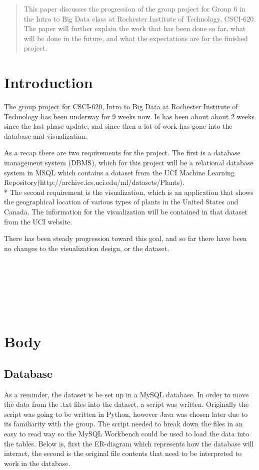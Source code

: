 \documentclass{Group6_Phase2}
\begin{document}
\maketitle
\begin{abstract}
This paper discusses the progression of the group project for Group 6 in the Intro to Big Data class at Rochester Institute of Technology, CSCI-620. The paper will further explain the work that has been done so far, what will be done in the future, and what the expectations are for the finished project. 
\end{abstract}


\section{Introduction}
The group project for CSCI-620, Intro to Big Data at Rochester Institute of Technology has been underway for 9 weeks now. Is has been about about 2 weeks since the last phase update, and since then a lot of work has gone into the database and visualization. 

As a recap there are two requirements for the project. The first is a database management system (DBMS), which for this project will be a relational database system in MSQL which contains a dataset from the UCI Machine Learning Repository(http://archive.ics.uci.edu/ml/datasets/Plants).\\* The second requirement is the visualization, which is an application that shows the geographical location of various types of plants in the United States and Canada. The information for the visualization will be contained in that dataset from the UCI website. 

There has been steady progression toward this goal, and so far there have been no changes to the visualization design, or the dataset. 
\\\\\\\\\\\\\\

\section{Body}

\subsection{Database}
As a reminder, the dataset is be set up in a MySQL database. In order to move the data from the .txt files into the dataset, a script was written. Originally the script was going to be written in Python, however Java was chosen later due to its familiarity with the group. The script needed to break down the files in an easy to read way so the MySQL Workbench could be used to load the data into the tables. Below is, first the ER-diagram which represents how the database will interact, the second is the original file contents that need to be interpreted to work in the database. 
\end{document}
